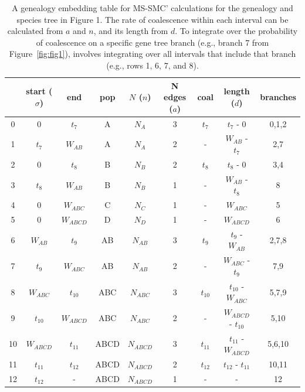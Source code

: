 \documentclass[11pt]{article}
\begin{document}
\begin{table}[h]
\centering
\caption{
	A genealogy embedding table for MS-SMC' calculations for the genealogy and
 	species tree in Figure 1. The rate of coalescence within each interval can 
 	be calculated from $a$ and $n$, and its length from $d$.
	To integrate over the probability of coalescence on a specific gene 
	tree branch (e.g., branch 7 from Figure~\ref{fig:fig1}), involves 
	integrating over all intervals that include that branch (e.g., rows 
	1, 6, 7, and 8).
}
\begin{tabular}[t]{ |c|c|c|c|c|c|c|c|c| }
	\toprule
	 & start ($\sigma$)  & end  & pop & $N$ ($n$)  & N edges ($a$) & coal  & length ($d$) & branches \\
	\midrule
	0 & 0          & $t_7$      & A   & $N_A$     & 3 & $t_7$    & $t_7$ - 0            & 0,1,2 \\
	1 & $t_7$      & $W_{AB}$   & A   & $N_A$     & 2 & -        & $W_{AB}$ - $t_7$     & 2,7   \\	
	2 & 0          & $t_8$      & B   & $N_B$     & 2 & $t_8$    & $t_8$ - 0            & 3,4   \\ 
	3 & $t_8$      & $W_{AB}$   & B   & $N_B$     & 1 & -        & $W_{AB}$ - $t_8$     & 8     \\
	4 & 0          & $W_{ABC}$  & C   & $N_C$     & 1 & -        & $W_{ABC}$            & 5     \\
	5 & 0          & $W_{ABCD}$ & D   & $N_D$     & 1 & -        & $W_{ABCD}$           & 6     \\
	6 & $W_{AB}$   & $t_9$      & AB  & $N_{AB}$  & 3 & $t_9$    & $t_9$ - $W_{AB}$     & 2,7,8 \\
	7 & $t_9$      & $W_{ABC}$  & AB  & $N_{AB}$  & 2 & -        & $W_{ABC}$ - $t_9$    & 7,9   \\
	8 & $W_{ABC}$  & $t_{10}$   & ABC & $N_{ABC}$ & 3 & $t_{10}$ & $t_{10}$ - $W_{ABC}$ & 5,7,9  \\
	9 & $t_{10}$   & $W_{ABCD}$ & ABC & $N_{ABC}$ & 2 & -        & $W_{ABCD}$ - $t_{10}$ & 5,10 \\
	10 & $W_{ABCD}$ & $t_{11}$  & ABCD & $N_{ABCD}$ & 3 & $t_{11}$ & $t_{11}$ - $W_{ABCD}$ & 5,6,10 \\
	11 & $t_{11}$  & $t_{12}$   & ABCD & $N_{ABCD}$ & 2 & $t_{12}$ & $t_{12}$ - $t_{11}$ & 10,11 \\
	12 & $t_{12}$  & -          & ABCD & $N_{ABCD}$ & 1 & -        & -                   & 12    \\	
	\bottomrule
\end{tabular}
\label{tab:table-1} 
\end{table}
\end{document}
